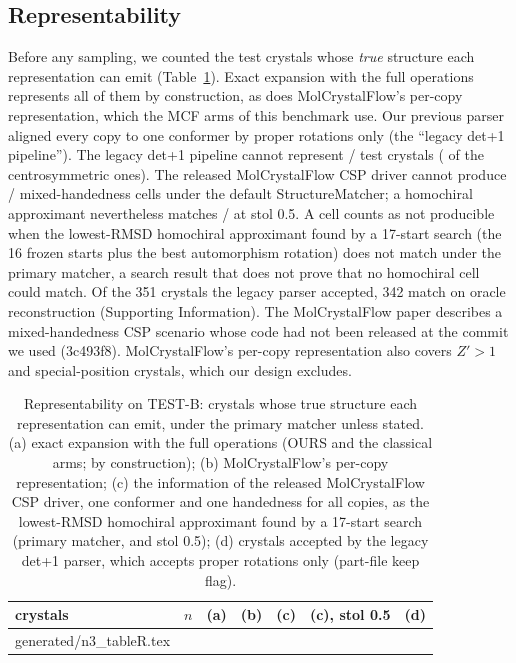 \documentclass[journal=acsodf,manuscript=article]{achemso}
\makeatletter
\newcommand{\inputrows}[1]{\@@input #1 }
\makeatother
\begin{document}
\subsection{Representability}
Before any sampling, we counted the test crystals whose \emph{true} structure each
representation can emit (Table~\ref{tab:repr}). Exact expansion with the full operations
represents all of them by construction, as does MolCrystalFlow's per-copy representation,
which the MCF arms of this benchmark use. Our previous parser aligned every copy to one
conformer by proper rotations only (the ``legacy det+1 pipeline''). The legacy det+1
pipeline cannot represent \nRLegacy/\nN{} test crystals (\nRLegacyCentro{} of the
centrosymmetric ones). The released MolCrystalFlow CSP driver cannot produce
\nRMixedMiss/\nRMixed{} mixed-handedness cells under the default StructureMatcher; a
homochiral approximant nevertheless matches \nRMixedApprox/\nRMixed{} at stol 0.5. A cell
counts as not producible when the lowest-RMSD homochiral approximant found by a 17-start
search (the 16 frozen starts plus the best automorphism rotation) does not match under the
primary matcher, a search result that does not prove that no homochiral cell could match.
Of the 351 crystals the legacy parser accepted, 342 match on oracle reconstruction
(Supporting Information). The MolCrystalFlow paper describes a mixed-handedness CSP
scenario whose code had not been released at the commit we used (3c493f8).
MolCrystalFlow's per-copy representation also covers $Z'>1$ and special-position crystals,
which our design excludes.

\begin{table}
\caption{Representability on TEST-B: crystals whose true structure each representation
can emit, under the primary matcher unless stated. (a) exact expansion with the full
operations (OURS and the classical arms; by construction); (b) MolCrystalFlow's per-copy
representation; (c) the information of the released MolCrystalFlow CSP driver, one
conformer and one handedness for all copies, as the lowest-RMSD homochiral approximant
found by a 17-start search (primary matcher, and stol 0.5); (d) crystals accepted by the
legacy det+1 parser, which accepts proper rotations only (part-file keep flag).}
\label{tab:repr}
\centering
\small
\begin{tabular}{lrrrrrr}
\toprule
crystals & $n$ & (a) & (b) & (c) & (c), stol 0.5 & (d) \\
\midrule
\inputrows{generated/n3_tableR.tex}
\bottomrule
\end{tabular}
\end{table}
\end{document}
